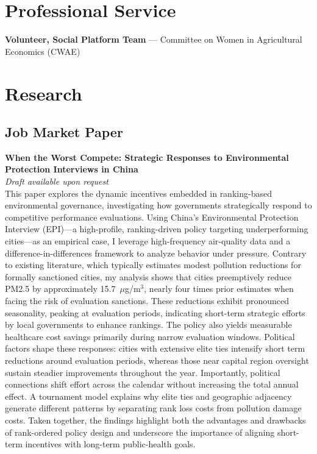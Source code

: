 \documentclass[11pt,letterpaper]{article}
\begin{document}
\section{Professional Service}

\textbf{Volunteer, Social Platform Team} — Committee on Women in Agricultural Economics (CWAE)


\section{Research}

\subsection{Job Market Paper}

\textbf{When the Worst Compete: Strategic Responses to Environmental Protection Interviews in China} \\
\textit{Draft available upon request} \\[4pt]
This paper explores the dynamic incentives embedded in ranking-based environmental governance, investigating how governments strategically respond to competitive performance evaluations. Using China's Environmental Protection Interview (EPI)—a high-profile, ranking-driven policy targeting underperforming cities—as an empirical case, I leverage high-frequency air-quality data and a difference-in-differences framework to analyze behavior under pressure. Contrary to existing literature, which typically estimates modest pollution reductions for formally sanctioned cities, my analysis shows that cities preemptively reduce PM2.5 by approximately 15.7~$\mu$g/m$^3$, nearly four times prior estimates when facing the risk of evaluation sanctions. These reductions exhibit pronounced seasonality, peaking at evaluation periods, indicating short-term strategic efforts by local governments to enhance rankings. The policy also yields measurable healthcare cost savings primarily during narrow evaluation windows. Political factors shape these responses: cities with extensive elite ties intensify short term reductions around evaluation periods, whereas those near capital region oversight sustain steadier improvements throughout the year. Importantly, political connections shift effort across the calendar without increasing the total annual effect. A tournament model explains why elite ties and geographic adjacency generate different patterns by separating rank loss costs from pollution damage costs. Taken together, the findings highlight both the advantages and drawbacks of rank-ordered policy design and underscore the importance of aligning short-term incentives with long-term public-health goals.
\end{document}
